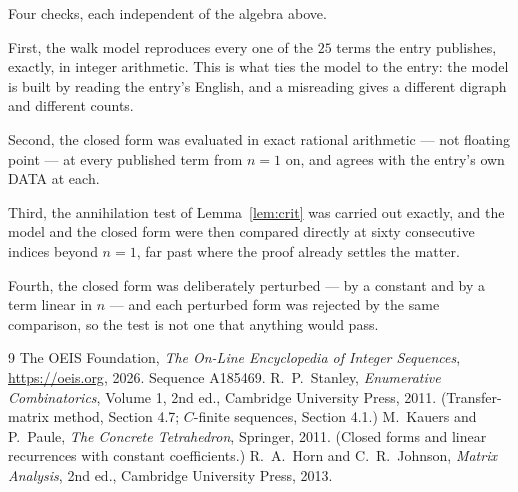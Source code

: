 \documentclass[11pt,a4paper]{article}
\theoremstyle{plain}
\theoremstyle{definition}
\begin{document}
Four checks, each independent of the algebra above.

First, the walk model reproduces every one of the $25$ terms the entry publishes,
exactly, in integer arithmetic. This is what ties the model to the entry: the model is built
by reading the entry's English, and a misreading gives a different digraph and different
counts.

Second, the closed form was evaluated in exact rational arithmetic --- not floating point ---
at every published term from $n=1$ on, and agrees with the entry's own DATA at each.

Third, the annihilation test of Lemma~\ref{lem:crit} was carried out exactly, and the model
and the closed form were then compared directly at sixty consecutive indices beyond
$n=1$, far past where the proof already settles the matter.

Fourth, the closed form was deliberately perturbed --- by a constant and by a term linear in
$n$ --- and each perturbed form was rejected by the same comparison, so the test is not one
that anything would pass.

\begin{thebibliography}{9}
 The OEIS Foundation, \emph{The On-Line Encyclopedia of Integer
Sequences}, \url{https://oeis.org}, 2026. Sequence A185469.
 R.~P.~Stanley, \emph{Enumerative Combinatorics}, Volume 1, 2nd ed.,
Cambridge University Press, 2011. (Transfer-matrix method, Section 4.7; $C$-finite sequences,
Section 4.1.)
 M.~Kauers and P.~Paule, \emph{The Concrete Tetrahedron}, Springer, 2011.
(Closed forms and linear recurrences with constant coefficients.)
 R.~A.~Horn and C.~R.~Johnson, \emph{Matrix Analysis}, 2nd ed., Cambridge
University Press, 2013.
\end{thebibliography}
\end{document}
